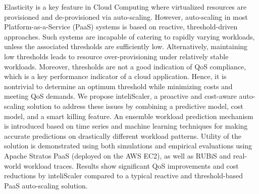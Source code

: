Elasticity is a key feature in Cloud Computing where virtualized resources are provisioned and de-provisioned via auto-scaling. However, auto-scaling in most Platform-as-a-Service (PaaS) systems is based on reactive, threshold-driven approaches. Such systems are incapable of catering to rapidly varying workloads, unless the associated thresholds are sufficiently low. Alternatively, maintaining low thresholds leads to resource over-provisioning under relatively stable workloads. Moreover, thresholds are not a good indication of QoS compliance, which is a key performance indicator of a cloud application. Hence, it is nontrivial to determine an optimum threshold while minimizing costs and meeting QoS demands. We propose inteliScaler, a proactive and cost-aware auto-scaling solution to address these issues by combining a predictive model, cost model, and a smart killing feature. An ensemble workload prediction mechanism is introduced based on time series and machine learning techniques for making accurate predictions on drastically different workload patterns. Utility of the solution is demonstrated using both simulations and empirical evaluations using Apache Stratos PaaS (deployed on the AWS EC2), as well as RUBiS and real-world workload traces. Results show significant QoS improvements and cost reductions by inteliScaler compared to a typical reactive and threshold-based PaaS auto-scaling solution.